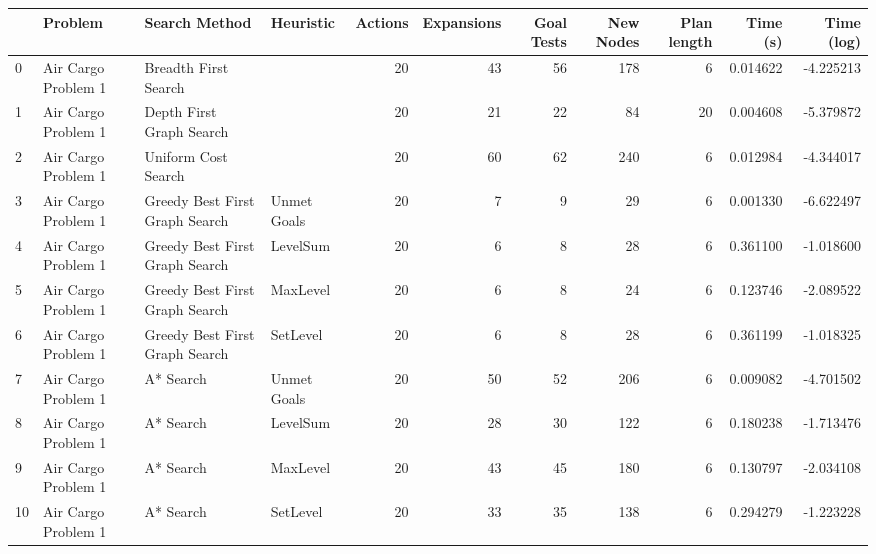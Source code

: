 \begin{tabular}{llllrrrrrrr}
\toprule
{} &              Problem &                   Search Method &    Heuristic &  Actions &  Expansions &  Goal Tests &  New Nodes &  Plan length &     Time (s) &  Time (log) \\
\midrule
0  &  Air Cargo Problem 1 &            Breadth First Search &              &       20 &          43 &          56 &        178 &            6 &     0.014622 &   -4.225213 \\
1  &  Air Cargo Problem 1 &        Depth First Graph Search &              &       20 &          21 &          22 &         84 &           20 &     0.004608 &   -5.379872 \\
2  &  Air Cargo Problem 1 &             Uniform Cost Search &              &       20 &          60 &          62 &        240 &            6 &     0.012984 &   -4.344017 \\
3  &  Air Cargo Problem 1 &  Greedy Best First Graph Search &  Unmet Goals &       20 &           7 &           9 &         29 &            6 &     0.001330 &   -6.622497 \\
4  &  Air Cargo Problem 1 &  Greedy Best First Graph Search &     LevelSum &       20 &           6 &           8 &         28 &            6 &     0.361100 &   -1.018600 \\
5  &  Air Cargo Problem 1 &  Greedy Best First Graph Search &     MaxLevel &       20 &           6 &           8 &         24 &            6 &     0.123746 &   -2.089522 \\
6  &  Air Cargo Problem 1 &  Greedy Best First Graph Search &     SetLevel &       20 &           6 &           8 &         28 &            6 &     0.361199 &   -1.018325 \\
7  &  Air Cargo Problem 1 &                       A* Search &  Unmet Goals &       20 &          50 &          52 &        206 &            6 &     0.009082 &   -4.701502 \\
8  &  Air Cargo Problem 1 &                       A* Search &     LevelSum &       20 &          28 &          30 &        122 &            6 &     0.180238 &   -1.713476 \\
9  &  Air Cargo Problem 1 &                       A* Search &     MaxLevel &       20 &          43 &          45 &        180 &            6 &     0.130797 &   -2.034108 \\
10 &  Air Cargo Problem 1 &                       A* Search &     SetLevel &       20 &          33 &          35 &        138 &            6 &     0.294279 &   -1.223228 \\

\end{tabular}
